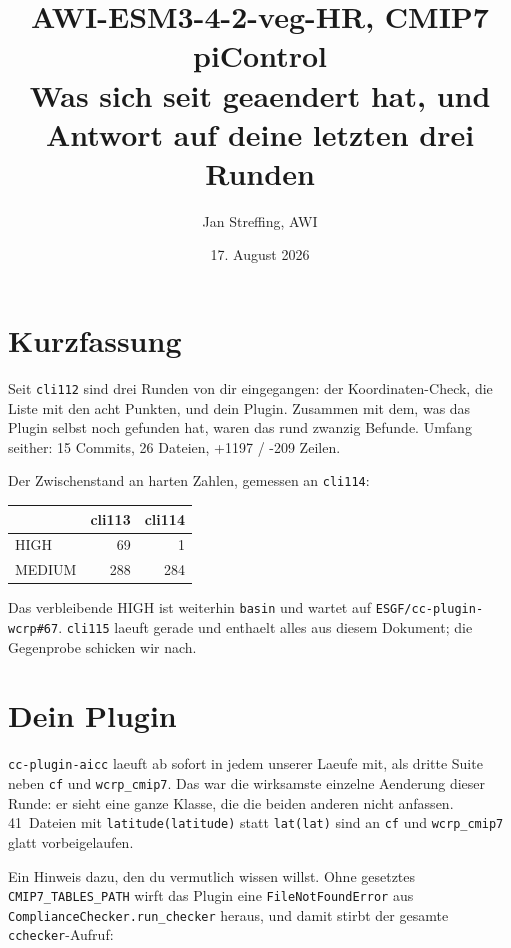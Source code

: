 \documentclass[11pt,a4paper]{article}
\title{AWI-ESM3-4-2-veg-HR, CMIP7 piControl\\[2mm]
\large Was sich seit \code{cli112} geaendert hat, und Antwort auf deine letzten drei Runden}
\author{Jan Streffing, AWI}
\date{17. August 2026}
\newcommand{\code}[1]{\texttt{\small #1}}
\begin{document}
\maketitle

\section{Kurzfassung}

Seit \code{cli112} sind drei Runden von dir eingegangen: der Koordinaten-Check, die
Liste mit den acht Punkten, und dein Plugin. Zusammen mit dem, was das Plugin selbst
noch gefunden hat, waren das rund zwanzig Befunde. Umfang seither: 15 Commits,
26 Dateien, +1197 / -209 Zeilen.

Der Zwischenstand an harten Zahlen, gemessen an \code{cli114}:

\begin{center}
\begin{tabular}{lrr}
\toprule
& \textbf{cli113} & \textbf{cli114} \\
\midrule
HIGH   & 69  & 1 \\
MEDIUM & 288 & 284 \\
\bottomrule
\end{tabular}
\end{center}

Das verbleibende HIGH ist weiterhin \code{basin} und wartet auf
\code{ESGF/cc-plugin-wcrp\#67}. \code{cli115} laeuft gerade und enthaelt alles aus
diesem Dokument; die Gegenprobe schicken wir nach.

\section{Dein Plugin}

\code{cc-plugin-aicc} laeuft ab sofort in jedem unserer Laeufe mit, als dritte Suite
neben \code{cf} und \code{wcrp\_cmip7}. Das war die wirksamste einzelne Aenderung
dieser Runde: er sieht eine ganze Klasse, die die beiden anderen nicht anfassen.
41~Dateien mit \code{latitude(latitude)} statt \code{lat(lat)} sind an \code{cf} und
\code{wcrp\_cmip7} glatt vorbeigelaufen.

Ein Hinweis dazu, den du vermutlich wissen willst. Ohne gesetztes
\code{CMIP7\_TABLES\_PATH} wirft das Plugin eine \code{FileNotFoundError} aus
\code{ComplianceChecker.run\_checker} heraus, und damit stirbt der gesamte
\code{cchecker}-Aufruf:
\end{document}
